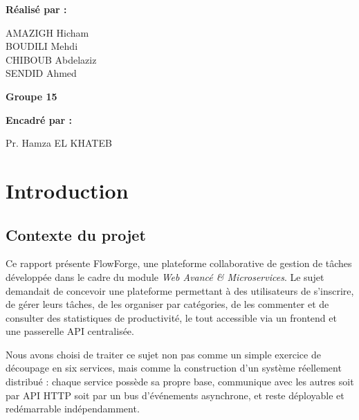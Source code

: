 \documentclass[11pt,a4paper,oneside]{report}
\newcommand{\membreUn}{AMAZIGH Hicham}
\newcommand{\membreDeux}{BOUDILI Mehdi}
\newcommand{\membreTrois}{CHIBOUB Abdelaziz}
\newcommand{\membreQuatre}{SENDID Ahmed}
\newcommand{\groupe}{Groupe 15}
\newcommand{\encadrant}{Pr. Hamza EL KHATEB}
\newcommand{\projet}{FlowForge}
\begin{document}
\begin{titlepage}
\vfill

{\large\bfseries Réalisé par :\par}
\vspace{0.3cm}
{\large
\membreUn\\[1.5mm]
\membreDeux\\[1.5mm]
\membreTrois\\[1.5mm]
\membreQuatre\par}

\vspace{0.55cm}
{\large\bfseries \groupe\par}

\vspace{0.6cm}
{\large\bfseries Encadré par :\par}
\vspace{0.15cm}
{\large \encadrant\par}

\vspace{0.4cm}
\end{titlepage}

\tableofcontents
\listoffigures
\cleardoublepage

\chapter{Introduction}

\section{Contexte du projet}

Ce rapport présente \projet, une plateforme collaborative de gestion de tâches
développée dans le cadre du module \emph{Web Avancé \& Microservices}. Le sujet
demandait de concevoir une plateforme permettant à des utilisateurs de
s'inscrire, de gérer leurs tâches, de les organiser par catégories, de les
commenter et de consulter des statistiques de productivité, le tout accessible
via un frontend et une passerelle API centralisée.

Nous avons choisi de traiter ce sujet non pas comme un simple exercice de
découpage en six services, mais comme la construction d'un système réellement
distribué : chaque service possède sa propre base, communique avec les autres
soit par API HTTP soit par un bus d'événements asynchrone, et reste déployable
et redémarrable indépendamment.
\end{document}
